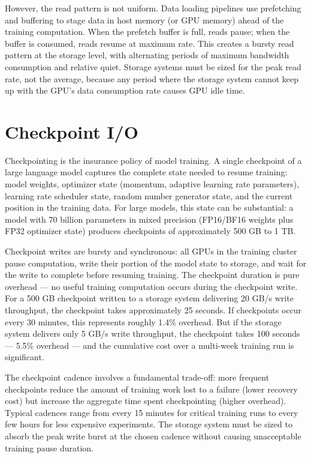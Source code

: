However, the read pattern is not uniform. Data loading pipelines use prefetching and buffering to stage data in host memory (or GPU memory) ahead of the training computation. When the prefetch buffer is full, reads pause; when the buffer is consumed, reads resume at maximum rate. This creates a bursty read pattern at the storage level, with alternating periods of maximum bandwidth consumption and relative quiet. Storage systems must be sized for the peak read rate, not the average, because any period where the storage system cannot keep up with the GPU's data consumption rate causes GPU idle time.

\section{Checkpoint I/O}

Checkpointing is the insurance policy of model training. A single checkpoint of a large language model captures the complete state needed to resume training: model weights, optimizer state (momentum, adaptive learning rate parameters), learning rate scheduler state, random number generator state, and the current position in the training data. For large models, this state can be substantial: a model with 70 billion parameters in mixed precision (FP16/BF16 weights plus FP32 optimizer state) produces checkpoints of approximately 500 GB to 1 TB.

Checkpoint writes are bursty and synchronous: all GPUs in the training cluster pause computation, write their portion of the model state to storage, and wait for the write to complete before resuming training. The checkpoint duration is pure overhead --- no useful training computation occurs during the checkpoint write. For a 500 GB checkpoint written to a storage system delivering 20 GB/s write throughput, the checkpoint takes approximately 25 seconds. If checkpoints occur every 30 minutes, this represents roughly 1.4\% overhead. But if the storage system delivers only 5 GB/s write throughput, the checkpoint takes 100 seconds --- 5.5\% overhead --- and the cumulative cost over a multi-week training run is significant.

The checkpoint cadence involves a fundamental trade-off: more frequent checkpoints reduce the amount of training work lost to a failure (lower recovery cost) but increase the aggregate time spent checkpointing (higher overhead). Typical cadences range from every 15 minutes for critical training runs to every few hours for less expensive experiments. The storage system must be sized to absorb the peak write burst at the chosen cadence without causing unacceptable training pause duration.

